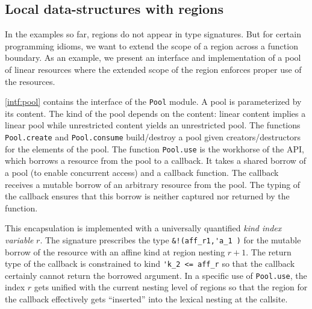 


\subsection{Local data-structures with regions}
\label{tuto:pool}

In the examples so far, regions do not appear in type signatures.
But for certain programming idioms, we want to extend the scope of a
region across a function boundary. As an example, 
we present an interface and implementation of a pool of linear resources where the
extended scope of the region enforces proper use of the resources.

\cref{intf:pool} contains the interface of the \lstinline/Pool/ module.
A pool is parameterized by its content. The kind of the pool
depends on the content: linear content implies
a linear pool while unrestricted content yields an unrestricted pool.
The functions \lstinline/Pool.create/ and \lstinline/Pool.consume/
build/destroy a pool given creators/destructors for the elements
of the pool.
The function \lstinline/Pool.use/ is the workhorse of the API, which
borrows a resource from the pool to a callback.
It takes a shared borrow of a pool (to enable concurrent access) and a
callback function.
The callback receives a mutable borrow of an arbitrary resource from the pool. 
The typing of the callback ensures
that this borrow is neither captured nor returned by the function.

This encapsulation is implemented with a universally quantified \emph{kind index variable} $r$.
The signature prescribes the type \lstinline/&!(aff_r1,'a_1 )/ for the
mutable borrow of the resource with an affine kind at region nesting $r+1$. The return
type of the callback is constrained to kind \lstinline/'k_2 <= aff_r/
so that the callback certainly cannot return the borrowed argument. 
In a specific use of \lstinline/Pool.use/, the index $r$ gets unified
with the current nesting level of regions so that the region for the
callback effectively gets ``inserted'' into the lexical nesting at the callsite.

